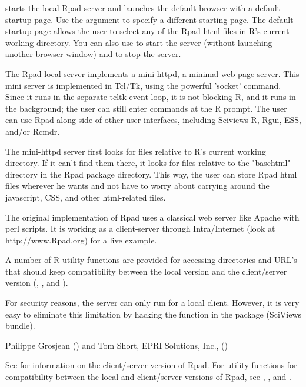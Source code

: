 \begin{Details}\relax
{} starts the local Rpad server and launches the default
browser with a default startup page. Use the  argument to
specify a different starting page. The default startup page allows the
user to select any of the Rpad html files in R's current working
directory. You can also use  to start the server
(without launching another browser window)
and  to stop the server.

The Rpad local server implements a mini-httpd, a minimal web-page server. This mini server is implemented in Tcl/Tk, using the powerful 'socket' command.
Since it runs in the separate tcltk event loop, it is not blocking R, and it
runs in the background; the user can still enter commands at the R
prompt. The user can use Rpad along side of other user interfaces,
including Sciviews-R, Rgui, ESS, and/or Rcmdr. 

The mini-httpd server first looks for files
relative to R's current working directory. If it can't find them
there, it looks for files relative to the "basehtml" directory in the
Rpad package directory. This way, the user can store Rpad html files
wherever he wants and not have to worry about carrying around the
javascript, CSS, and other html-related files.

The original implementation of Rpad uses a classical web server like Apache with perl scripts.
It is working as a client-server through Intra/Internet (look at http://www.Rpad.org)
for a live example.

A number of R utility functions are provided for
accessing directories and URL's that should keep compatibility between
the local version and the client/server version (, , and
).
\end{Details}
\begin{Note}\relax
For security reasons, the server can only run for a local client. However,
it is very easy to eliminate this limitation by hacking the 
function in the  package (SciViews bundle).
\end{Note}
\begin{Author}\relax
Philippe Grosjean () and Tom Short, EPRI Solutions, Inc., ()
\end{Author}
\begin{SeeAlso}\relax
See  for information on the
client/server version of Rpad. For utility functions for compatibility
between the local and client/server versions of Rpad, see , , and
.
\end{SeeAlso}

